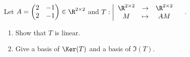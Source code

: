 \documentclass[11pt,nocut]{article}
\begin{document}
\begin{problem}[$\star$]
	Let $A 
	= \begin{pmatrix}
		2 & -1 \\
		2 & -1
	\end{pmatrix}
	\in \R^{2 \times 2}$ 
	and $\displaystyle
	T: \left| 
	\begin{array}{ccc}
		\R^{2 \times 2} & \to & \R^{2 \times 2}\\
		M & \mapsto & AM
	\end{array}
\right.\quad$.
\begin{enumerate}[label=\normalfont(\textbf{\alph*})]
	\item Show that $T$ is linear. 
	\item Give a basis of $\Ker(T)$ and a basis of $\Im(T)$.
\end{enumerate} 
\end{problem}
\end{document}
